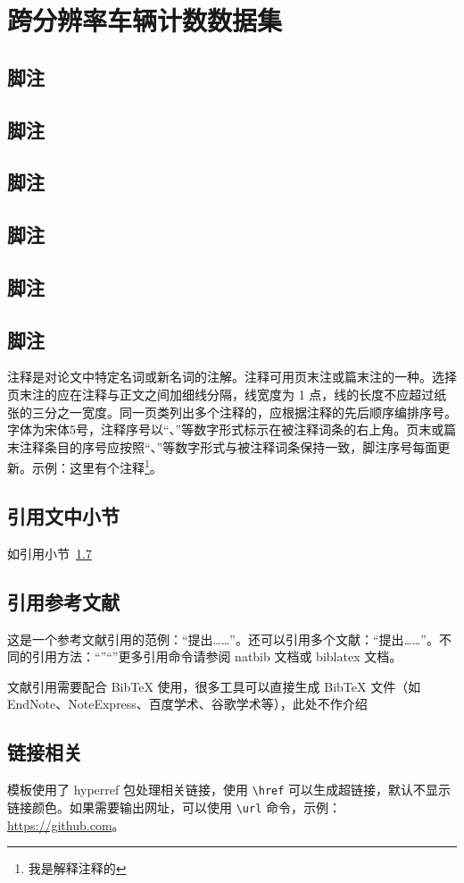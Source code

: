 
\chapter{跨分辨率车辆计数数据集}

\section{脚注}
\section{脚注}
\section{脚注}
\section{脚注}
\section{脚注}
\section{脚注}
注释是对论文中特定名词或新名词的注解。注释可用页末注或篇末注的一种。选择页末注的应在注释与正文之间加细线分隔，线宽度为 1 点，线的长度不应超过纸张的三分之一宽度。同一页类列出多个注释的，应根据注释的先后顺序编排序号。字体为宋体5号，注释序号以“、”等数字形式标示在被注释词条的右上角。页末或篇末注释条目的序号应按照“、”等数字形式与被注释词条保持一致，脚注序号每面更新。示例：这里有个注释\footnote{我是解释注释的}。

\section{引用文中小节}\label{sec:ref}
如引用小节~\ref{sec:ref} 

\section{引用参考文献}
这是一个参考文献引用的范例：“\cite{江泽民1989能源发展趋势及主要节能措施}提出……”。还可以引用多个文献：“\cite{kuhn2004man,江泽民2008新时期我国信息技术产业的发展,江泽民1989能源发展趋势及主要节能措施}提出……”。不同的引用方法：“\citet{江泽民1989能源发展趋势及主要节能措施}”“\citep{江泽民2008新时期我国信息技术产业的发展}”更多引用命令请参阅 natbib 文档或 biblatex 文档。\nocite{*}

文献引用需要配合 BibTeX 使用，很多工具可以直接生成 BibTeX 文件（如 EndNote、NoteExpress、百度学术、谷歌学术等），此处不作介绍

\section{链接相关}
模板使用了 hyperref 包处理相关链接，使用 \verb|\href| 可以生成超链接，默认不显示链接颜色。如果需要输出网址，可以使用 \verb|\url| 命令，示例：\url{https://github.com}。